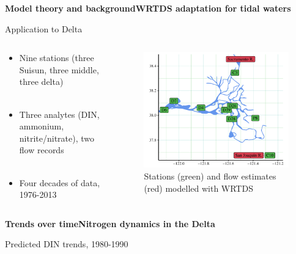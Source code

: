 \documentclass[serif]{beamer}\usepackage[]{graphicx}\usepackage[]{color}
\begin{document}
 
\begin{frame}{\textbf{Model theory and background}}{\textbf{WRTDS adaptation for tidal waters}} 
{\bf \centerline{Application to Delta}}
\begin{columns}
\begin{column}{0.45\textwidth}
\begin{itemize}
\item Nine stations (three Suisun, three middle, three delta) \\~\\
\item Three analytes (DIN, ammonium, nitrite/nitrate), two flow records \\~\\
\item Four decades of data, 1976-2013
\end{itemize}
\end{column}
\begin{column}{0.45\textwidth}
\begin{figure}
\begin{center}
\includegraphics[width = \textwidth]{fig/stations.pdf}
\caption{Stations (green) and flow estimates (red) modelled with WRTDS}
\end{center}
\end{figure}
\end{column}
\end{columns}
\end{frame}



\begin{frame}{\textbf{Trends over time}}{\textbf{Nitrogen dynamics in the Delta}} 
{\bf \centerline{Predicted DIN trends, 1980-1990}}
\vspace{0.05in}
\centerline{
}
\end{frame}
\end{document}
